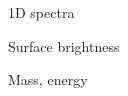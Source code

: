 \documentclass[12pt,preprint]{aastex}
\begin{document}
%

\begin{figure}
\caption{
1D spectra
}
\label{fig:1D}
\end{figure}

\begin{figure}
\caption{
Surface brightness
}
\label{fig:SB}
\end{figure}

\begin{figure}
\caption{
Mass, energy
}
\label{fig:mass_energy}
\end{figure}
\end{document}

